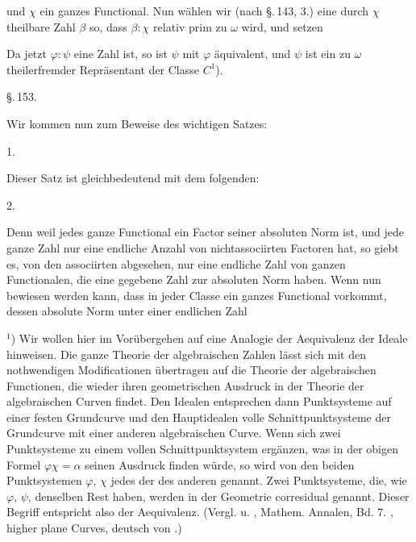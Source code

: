 und $\chi$ ein ganzes Functional. Nun wählen wir (nach \S.\,143, 3.) eine durch $\chi$ theilbare Zahl $\beta$ so, dass $\beta:\chi$ relativ prim zu $\omega$ wird, und setzen


Da jetzt $\varphi:\psi$ eine Zahl ist, so ist $\psi$ mit $\varphi$ äquivalent, und $\psi$ ist ein zu $\omega$ theilerfremder Repräsentant der Classe $C^1$).

\S.\,153.


Wir kommen nun zum Beweise des wichtigen Satzes:

1. 

Dieser Satz ist gleichbedeutend mit dem folgenden:

2. 

Denn weil jedes ganze Functional ein Factor seiner absoluten Norm ist, und jede ganze Zahl nur eine endliche Anzahl von nichtassociirten Factoren hat, so giebt es, von den associirten abgesehen, nur eine endliche Zahl von ganzen Functionalen, die eine gegebene Zahl zur absoluten Norm haben. Wenn nun bewiesen werden kann, dass in jeder Classe ein ganzes Functional vorkommt, dessen absolute Norm unter einer endlichen Zahl

\begin{footnotesize}
$^1$) Wir wollen hier im Vorübergehen auf eine Analogie der Aequivalenz der Ideale hinweisen. Die ganze Theorie der algebraischen Zahlen lässt sich mit den nothwendigen Modificationen übertragen auf die Theorie der algebraischen Functionen, die wieder ihren geometrischen Ausdruck in der Theorie der algebraischen Curven findet. Den Idealen entsprechen dann Punktsysteme auf einer festen Grundcurve und den Hauptidealen volle Schnittpunktsysteme der Grundcurve mit einer anderen algebraischen Curve. Wenn sich zwei Punktsysteme zu einem vollen Schnittpunktsystem ergänzen, was in der obigen Formel $\varphi\chi = \alpha$ seinen Ausdruck finden würde, so wird von den beiden Punktsystemen $\varphi$, $\chi$ jedes der  des anderen genannt. Zwei Punktsysteme, die, wie $\varphi$, $\psi$, denselben Rest haben, werden in der Geometrie corresidual genannt. Dieser Begriff entspricht also der Aequivalenz. (Vergl.  u. , Mathem. Annalen, Bd. 7. , \glqq higher plane Curves\grqq{}, deutsch von .)
\end{footnotesize}
